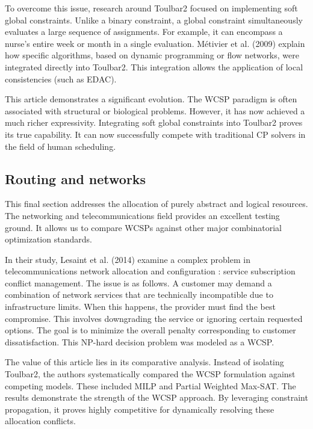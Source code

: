\documentclass[a4paper]{article}
\begin{document}
To overcome this issue, research around Toulbar2 focused on implementing soft global constraints. Unlike a binary constraint, a global constraint simultaneously evaluates a large sequence of assignments. 
For example, it can encompass a nurse's entire week or month in a single evaluation.
Métivier et al. (2009) explain how specific algorithms, based on dynamic programming or flow networks, were integrated directly into Toulbar2. This integration allows the application of local consistencies (such as \ac{EDAC}).
\newline

This article demonstrates a significant evolution. The \ac{WCSP} paradigm is often associated with structural or biological problems. However, it has now achieved a much richer expressivity.
Integrating soft global constraints into Toulbar2 proves its true capability. It can now successfully compete with traditional \ac{CP} solvers in the field of human scheduling.

\subsection{Routing and networks}

This final section addresses the allocation of purely abstract and logical resources. The networking and telecommunications field provides an excellent testing ground. It allows us to compare \acp{WCSP} against other major combinatorial optimization standards.
\newline

In their study, Lesaint et al. (2014)\cite{lesaint2014developing} examine a complex problem in telecommunications network allocation and configuration : service subscription conflict management. The issue is as follows. A customer may demand a combination of network services that are technically incompatible due to infrastructure limits. 
When this happens, the provider must find the best compromise. This involves downgrading the service or ignoring certain requested options. The goal is to minimize the overall penalty corresponding to customer dissatisfaction.
This NP-hard decision problem was modeled as a \ac{WCSP}.
\newline

The value of this article lies in its comparative analysis. Instead of isolating Toulbar2, the authors systematically compared the \ac{WCSP} formulation against competing models. These included \ac{MILP} and Partial Weighted Max-SAT. 
The results demonstrate the strength of the \ac{WCSP} approach. By leveraging constraint propagation, it proves highly competitive for dynamically resolving these allocation conflicts.
\newline
\end{document}
